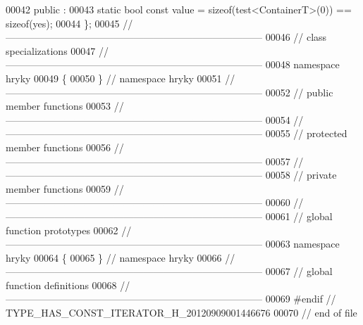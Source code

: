 \begin{DoxyCode}
00042 \textcolor{keyword}{public} :
00043     \textcolor{keyword}{static} \textcolor{keywordtype}{bool} \textcolor{keyword}{const} value = \textcolor{keyword}{sizeof}(test<ContainerT>(0)) == \textcolor{keyword}{sizeof}(yes);
00044 \};
00045 \textcolor{comment}{//
      ------------------------------------------------------------------------------}
00046 \textcolor{comment}{// class specializations}
00047 \textcolor{comment}{//
      ------------------------------------------------------------------------------}
00048 \textcolor{keyword}{namespace }hryky
00049 \{
00050 \} \textcolor{comment}{// namespace hryky}
00051 \textcolor{comment}{//
      ------------------------------------------------------------------------------}
00052 \textcolor{comment}{// public member functions}
00053 \textcolor{comment}{//
      ------------------------------------------------------------------------------}
00054 \textcolor{comment}{//
      ------------------------------------------------------------------------------}
00055 \textcolor{comment}{// protected member functions}
00056 \textcolor{comment}{//
      ------------------------------------------------------------------------------}
00057 \textcolor{comment}{//
      ------------------------------------------------------------------------------}
00058 \textcolor{comment}{// private member functions}
00059 \textcolor{comment}{//
      ------------------------------------------------------------------------------}
00060 \textcolor{comment}{//
      ------------------------------------------------------------------------------}
00061 \textcolor{comment}{// global function prototypes}
00062 \textcolor{comment}{//
      ------------------------------------------------------------------------------}
00063 \textcolor{keyword}{namespace }hryky
00064 \{
00065 \} \textcolor{comment}{// namespace hryky}
00066 \textcolor{comment}{//
      ------------------------------------------------------------------------------}
00067 \textcolor{comment}{// global function definitions}
00068 \textcolor{comment}{//
      ------------------------------------------------------------------------------}
00069 \textcolor{preprocessor}{#endif // TYPE\_HAS\_CONST\_ITERATOR\_H\_20120909001446676}
00070 \textcolor{preprocessor}{}\textcolor{comment}{// end of file}
\end{DoxyCode}
